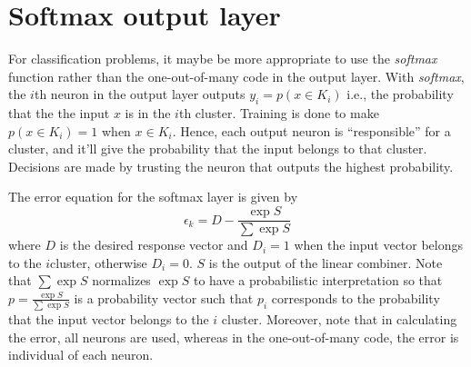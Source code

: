 \documentclass[a4paper]{article}
\begin{document}
\section{Softmax output layer}
For classification problems, it maybe be more appropriate to use the \textit{softmax} function rather than the one-out-of-many code in the output layer. With \textit{softmax}, the $i$th neuron in the output layer outputs $y_i = p(x \in K_i)$ i.e., the probability that the the input $x$ is in the $i$th cluster. Training is done to make $p(x \in K_i) = 1$ when $x \in K_i$. Hence, each output neuron is ``responsible'' for a cluster, and it'll give the probability that the input belongs to that cluster. Decisions are made by trusting the neuron that outputs the highest probability. 

The error equation for the softmax layer is given by
\begin{equation}
\epsilon_k = D - \frac{\exp{S}}{\sum\exp{S}}
\end{equation}
where $D$ is the desired response vector and $D_i = 1$ when the input vector belongs to the $i$cluster, otherwise $D_i = 0$. $S$ is the output of the linear combiner. Note that $\sum\exp{S}$ normalizes $\exp{S}$ to have a probabilistic interpretation so that $p = \frac{\exp{S}}{\sum\exp{S}}$ is a probability vector such that $p_i$ corresponds to the probability that the input vector belongs to the $i$ cluster. Moreover, note that in calculating the error, all neurons are used, whereas in the one-out-of-many code, the error is individual of each neuron.
\end{document}
